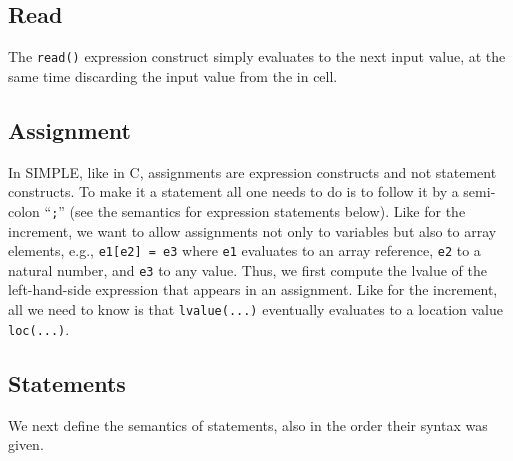 \documentclass{article}
\begin{document}
\begin{kdefinition}
\begin{module}{}
\begin{kblock}[text]
 \subsection{Read}
The \texttt{read()} expression construct simply evaluates to the next
input value, at the same time discarding the input value from the
\textsf{in} cell. \end{kblock}
\begin{kblock}[text]
 \subsection{Assignment}
In SIMPLE, like in C, assignments are expression constructs and not statement
constructs.  To make it a statement all one needs to do is to follow it by a
semi-colon ``\texttt{;}'' (see the semantics for expression statements below).
Like for the increment, we want to allow assignments not only to variables but
also to array elements, e.g., \texttt{e1[e2] = e3} where \texttt{e1} evaluates
to an array reference, \texttt{e2} to a natural number, and \texttt{e3} to any 
value.  Thus, we first compute the lvalue of the left-hand-side expression
that appears in an assignment.  Like for the increment, all we need to know is
that \texttt{lvalue(...)} eventually evaluates to a location value
\texttt{loc(...)}. \end{kblock}
\begin{kblock}[text]
 \section{Statements}
We next define the \K semantics of statements, also in the order their syntax
was given. \end{kblock}
\begin{kblock}[text]

\end{kblock}
\end{module}
\end{kdefinition}
\end{document}
